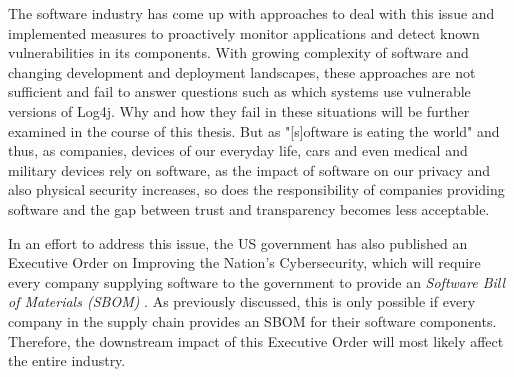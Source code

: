 The software industry has come up with approaches to deal with this issue and implemented measures to proactively monitor applications and detect known vulnerabilities in its components. With growing complexity of software and changing development and deployment landscapes, these approaches are not sufficient and fail to answer questions such as which systems use vulnerable versions of Log4j. Why and how they fail in these situations will be further examined in the course of this thesis. 
But as "[s]oftware is eating the world"\cite{MarcAndreessen} and thus, as companies, devices of our everyday life, cars and even medical and military devices rely on software, as the impact of software on our privacy and also physical security increases, so does the responsibility of companies providing software and the gap between trust and transparency becomes less acceptable.\par
In an effort to address this issue, the US government has also published an Executive Order on Improving the Nation's Cybersecurity, which will require every company supplying software to the government to provide an \textit{Software Bill of Materials (SBOM)} \cite{ExecutiveOrderSBOM,NTIASBOM}. As previously discussed, this is only possible if every company in the supply chain provides an SBOM for their software components. Therefore, the downstream impact of this Executive Order will most likely affect the entire industry.

